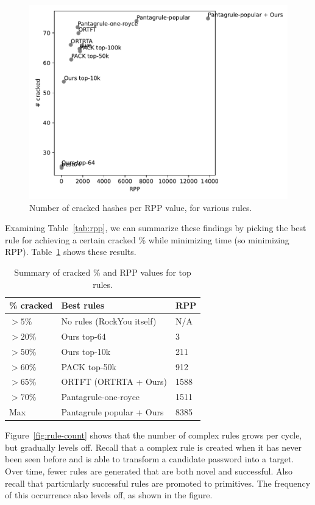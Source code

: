 \documentclass{article}
\begin{document}
\begin{figure}[h!]
\centering
    \includegraphics[width=0.7\linewidth]
{figures/cracked_attempted_rpp_plot_b187899c-a7a0-11ed-8444-005056c00001.pdf}
    \caption{Number of cracked hashes per RPP value, for various rules.}
    \label{fig:rpp}
\end{figure}

Examining Table~\ref{tab:rpp}, we can summarize these findings by picking the
best rule for achieving a certain cracked \% while minimizing time (so
minimizing RPP). Table~\ref{tab:summary} shows these results.

\begin{table}[h]
\centering
\begin{tabular}{|l|l|l|}
    \hline
    \% cracked & Best rules & RPP \\
    \hline
    $>5\%$ & No rules (RockYou itself) & N/A \\
    $>20\%$ & Ours top-64 & 3 \\
    $>50\%$ & Ours top-10k & 211 \\
    $>60\%$ & PACK top-50k & 912 \\
    $>65\%$ & ORTFT (ORTRTA + Ours) & 1588 \\
    $>70\%$ & Pantagrule-one-royce & 1511 \\
    Max & Pantagrule popular + Ours & 8385 \\
    \hline
\end{tabular}
\caption{Summary of cracked \% and RPP values for top rules.}
\label{tab:summary}
\end{table}

Figure~\ref{fig:rule-count} shows that the number of complex rules grows per
cycle, but gradually levels off. Recall that a complex rule is created when it
has never been seen before and is able to transform a candidate password into a
target. Over time, fewer rules are generated that are both novel and
successful. Also recall that particularly successful rules are promoted to
primitives. The frequency of this occurrence also levels off, as shown in the
figure.
\end{document}
